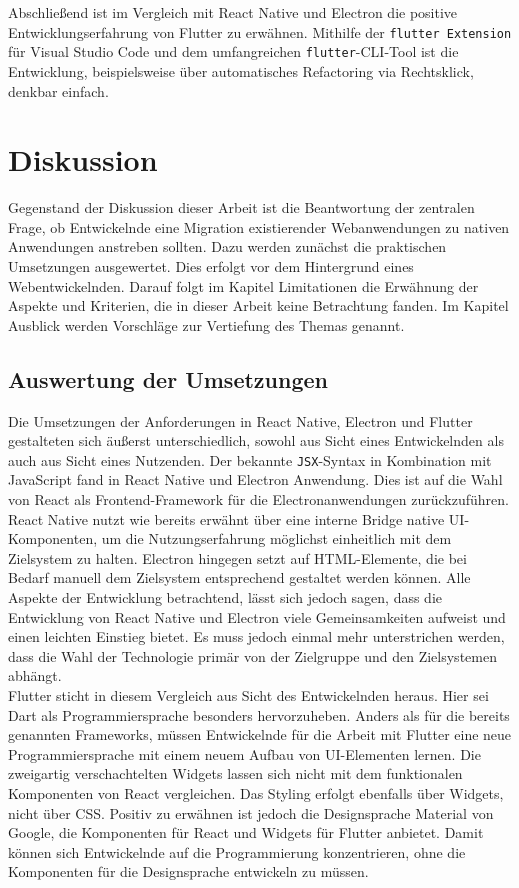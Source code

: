 \documentclass[a4paper]{scrartcl}
\begin{document}
Abschließend ist im Vergleich mit React Native und Electron die positive Entwicklungserfahrung von Flutter zu erwähnen. Mithilfe der \texttt{flutter Extension} für Visual Studio Code und dem umfangreichen \texttt{flutter}-CLI-Tool ist die Entwicklung, beispielsweise über automatisches Refactoring via Rechtsklick, denkbar einfach.

\newpage

\section{Diskussion}

Gegenstand der Diskussion dieser Arbeit ist die Beantwortung der zentralen Frage, ob Entwickelnde eine Migration existierender Webanwendungen zu nativen Anwendungen anstreben sollten. Dazu werden zunächst die praktischen Umsetzungen ausgewertet. Dies erfolgt vor dem Hintergrund eines Webentwickelnden. Darauf folgt im Kapitel Limitationen die Erwähnung der Aspekte und Kriterien, die in dieser Arbeit keine Betrachtung fanden. Im Kapitel Ausblick werden Vorschläge zur Vertiefung des Themas genannt.

\subsection{Auswertung der Umsetzungen}

Die Umsetzungen der Anforderungen in React Native, Electron und Flutter gestalteten sich äußerst unterschiedlich, sowohl aus Sicht eines Entwickelnden als auch aus Sicht eines Nutzenden. Der bekannte \texttt{JSX}-Syntax in Kombination mit JavaScript fand in React Native und Electron Anwendung. Dies ist auf die Wahl von React als Frontend-Framework für die Electronanwendungen zurückzuführen. React Native nutzt wie bereits erwähnt über eine interne Bridge native UI-Komponenten, um die Nutzungserfahrung möglichst einheitlich mit dem Zielsystem zu halten. Electron hingegen setzt auf HTML-Elemente, die bei Bedarf manuell dem Zielsystem entsprechend gestaltet werden können. Alle Aspekte der Entwicklung betrachtend, lässt sich jedoch sagen, dass die Entwicklung von React Native und Electron viele Gemeinsamkeiten aufweist und einen leichten Einstieg bietet. Es muss jedoch einmal mehr unterstrichen werden, dass die Wahl der Technologie primär von der Zielgruppe und den Zielsystemen abhängt. \\
Flutter sticht in diesem Vergleich aus Sicht des Entwickelnden heraus. Hier sei Dart als Programmiersprache besonders hervorzuheben. Anders als für die bereits genannten Frameworks, müssen Entwickelnde für die Arbeit mit Flutter eine neue Programmiersprache mit einem neuem Aufbau von UI-Elementen lernen. Die zweigartig verschachtelten Widgets lassen sich nicht mit dem funktionalen Komponenten von React vergleichen. Das Styling erfolgt ebenfalls über Widgets, nicht über CSS. Positiv zu erwähnen ist jedoch die Designsprache Material von Google, die Komponenten für React und Widgets für Flutter anbietet. Damit können sich Entwickelnde auf die Programmierung konzentrieren, ohne die Komponenten für die Designsprache entwickeln zu müssen. \\
\end{document}
